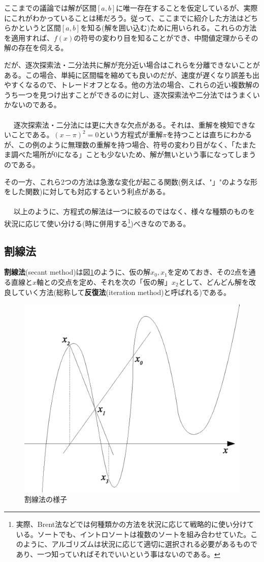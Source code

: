 ここまでの議論では解が区間$[a,b]$に唯一存在することを仮定しているが、実際にこれがわかっていることは稀だろう。従って、ここまでに紹介した方法はどちらかというと区間$[a,b]$を知る(解を囲い込む)ために用いられる。これらの方法を適用すれば、$f(x)$の符号の変わり目を知ることができ、中間値定理からその解の存在を伺える。

だが、逐次探索法・二分法共に解が充分近い場合はこれらを分離できないことがある。この場合、単純に区間幅を縮めても良いのだが、速度が遅くなり誤差も出やすくなるので、トレードオフとなる。他の方法の場合、これらの近い複数解のうち一つを見つけ出すことができるのに対し、逐次探索法や二分法ではうまくいかないのである。
\\ \\　
逐次探索法・二分法には更に大きな欠点がある。それは、重解を検知できないことである。$(x-\pi)^2=0$という方程式が重解$\pi$を持つことは直ちにわかるが、この例のように無理数の重解を持つ場合、符号の変わり目がなく、「たまたま調べた場所が0になる」ことも少ないため、解が無いという事になってしまうのである。

その一方、これら2つの方法は急激な変化が起こる関数(例えば、"」"のような形をした関数)に対しても対応するという利点がある。
\\ \\　
以上のように、方程式の解法は一つに絞るのではなく、様々な種類のものを状況に応じて使い分ける(時に併用する\footnote{実際、Brent法などでは何種類かの方法を状況に応じて戦略的に使い分けている。ソートでも、イントロソートは複数のソートを組み合わせていた。このように、アルゴリズムは状況に応じて適切に選択される必要があるものであり、一つ知っていればそれでいいという事はないのである。})べきなのである。

\subsection{割線法}
\textbf{割線法}(secant method)は図\ref{fig15_2}のように、仮の解$x_0,x_1$を定めておき、その2点を通る直線と$x$軸との交点を定め、それを次の「仮の解」$x_2$として、どんどん解を改良していく方法(総称して\textbf{反復法}(iteration method)と呼ばれる)である。

\begin{figure}[htb]
\centering
\includegraphics[width=0.5\linewidth,keepaspectratio]{fig15_2.eps}
\caption{割線法の様子}\label{fig15_2}
\end{figure}

